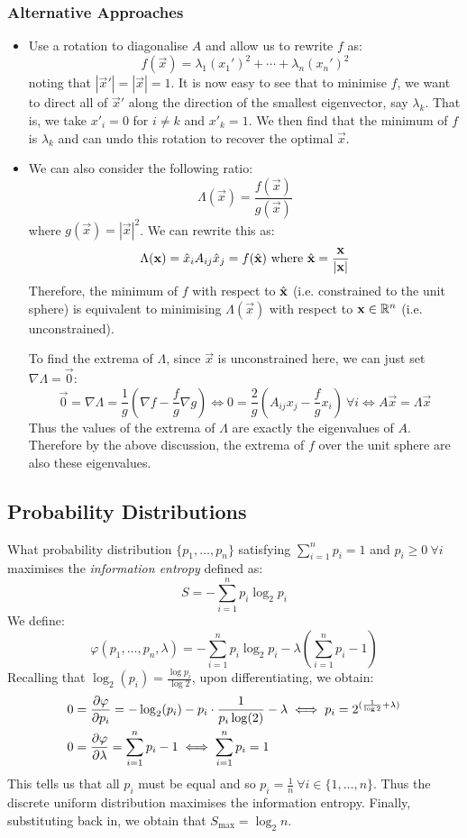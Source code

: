 \documentclass[../main.tex]{subfiles}
\begin{document}
\subsubsection{Alternative Approaches}
\begin{itemize}
  \item Use a rotation to diagonalise $A$ and allow us to rewrite $f$ as:
    \[
      f(\vec{x}) = \lambda_1 (x_1')^2 + \cdots + \lambda_n (x_n')^2
    \]
    noting that $|\vec{x}'| = |\vec{x}| = 1$.
    It is now easy to see that to minimise $f$, we want to direct all of $\vec{x}'$ along the direction of the smallest eigenvector, say $\lambda_k$.
    That is, we take $x'_i = 0$ for $i \neq k$ and $x'_k = 1$.
    We then find that the minimum of $f$ is $\lambda_k$ and can undo this rotation to recover the optimal $\vec{x}$.
  \item We can also consider the following ratio: \label{alternativeApproach}
    \[
      \Lambda(\vec{x}) = \frac{f(\vec{x})}{g(\vec{x})}
    \]
    where $g(\vec{x}) = |\vec{x}|^2$.
    We can rewrite this as:
    \[
      \Lambda(\mathbf{\bm{x}}) = \hat{x}_i A_{i j} \hat{x}_j = f(\hat{\mathbf{\bm{x}}}) \text{ where $\hat{\mathbf{\bm{x}}} = \frac{\mathbf{\bm{x}}}{|\mathbf{\bm{x}}|}$}
    \]
    Therefore, the minimum of $f$ with respect to $\hat{\mathbf{\bm{x}}}$ (i.e. constrained to the unit sphere) is equivalent to minimising $\Lambda(\vec{x})$ with respect to $\mathbf{\bm{x}} \in \mathbb{R}^n$ (i.e. unconstrained).

    To find the extrema of $\Lambda$, since $\vec{x}$ is unconstrained here, we can just set $\nabla \Lambda = \vec{0}$:
    \[
      \vec{0} = \nabla \Lambda = \frac{1}{g}\left(\nabla f - \frac{f}{g} \nabla g\right) \iff 0 = \frac{2}{g}\left(A_{i j}x_j - \frac{f}{g}x_i\right)\ \forall i \iff A \vec{x} = \Lambda \vec{x}
    \]
    Thus the values of the extrema of $\Lambda$ are exactly the eigenvalues of $A$.
    Therefore by the above discussion, the extrema of $f$ over the unit sphere are also these eigenvalues.
\end{itemize}
\subsection{Probability Distributions}
What probability distribution $\{p_1, \ldots, p_n\}$ satisfying $\sum_{i = 1}^{n} p_i = 1$ and $p_i \geq 0\ \forall i$ maximises the \textit{information entropy} defined as:
\[
  S = - \sum_{i = 1}^{n} p_i \log_{2} p_i
\]
We define:
\[
  \varphi(p_1, \ldots, p_n, \lambda)= - \sum_{i = 1}^{n} p_i \log_{2} p_i - \lambda \left(\sum_{i = 1}^{n} p_i - 1\right)
\]
Recalling that $\log_{2}(p_i) = \frac{\log p_i}{\log 2}$, upon differentiating, we obtain:
\begin{align*}
  0 &= \pderiv{\varphi}{p_i} = - \log_{2}(p_i) - p_i \cdot \frac{1}{p_i \log(2)} - \lambda \iff p_i = 2^{(\frac{1}{\log 2} + \lambda)} \\
  0 &= \pderiv{\varphi}{\lambda} = \sum_{i = 1}^{n} p_i - 1 \iff \sum_{i = 1}^{n} p_i = 1
\end{align*}
This tells us that all $p_i$ must be equal and so $p_i = \frac{1}{n}\ \forall i \in \{1, \ldots, n\}$.
Thus the discrete uniform distribution maximises the information entropy.
Finally, substituting back in, we obtain that $S_{\text{max}} = \log_{2} n$.
\end{document}
